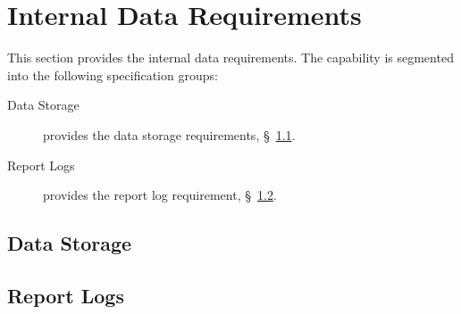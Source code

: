 \KNEADSECTIONNEWPAGE
\section{Internal Data Requirements}
\label{lab:sec_InternalData}


This section provides the internal data requirements. The \ThisSys capability is segmented into the following specification groups:

\begin{description}
	\item [Data Storage] provides the data storage requirements, \S~\ref{loc:IDR_Data_Storage}.
	\item [Report Logs] provides the report log requirement, \S~\ref{loc:IDR_Report_Logs}.
\end{description}

\KNEADSUBSECTIONNEWPAGE
\subsection{Data Storage}
\label{loc:IDR_Data_Storage}




\KNEADSUBSECTIONNEWPAGE
\subsection{Report Logs}
\label{loc:IDR_Report_Logs}




